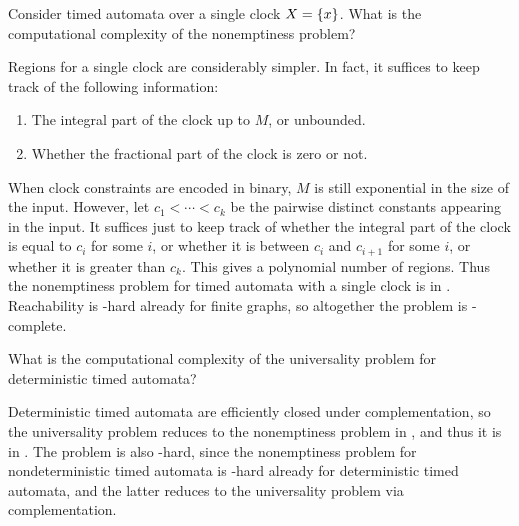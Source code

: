 \begin{exercise}
    Consider timed automata over a single clock $X = \left\{x\right\}$.
    What is the computational complexity of the nonemptiness problem?
\end{exercise}
\begin{solution}
    Regions for a single clock are considerably simpler.
    In fact, it suffices to keep track of the following information:
    \begin{enumerate}
        \item The integral part of the clock up to $M$, or unbounded.
        \item Whether the fractional part of the clock is zero or not.
    \end{enumerate}
    When clock constraints are encoded in binary, $M$ is still exponential in the size of the input.
    However, let $c_1 < \cdots < c_k$ be the pairwise distinct constants appearing in the input.
    It suffices just to keep track of whether the integral part of the clock is equal to $c_i$ for some $i$,
    or whether it is between $c_i$ and $c_{i + 1}$ for some $i$, or whether it is greater than $c_k$.
    This gives a polynomial number of regions.
    Thus the nonemptiness problem for timed automata with a single clock is in \NL.
    Reachability is \NL-hard already for finite graphs, so altogether the problem is \NL-complete.
\end{solution}

\begin{exercise}
    What is the computational complexity of the universality problem for deterministic timed automata?
\end{exercise}
\begin{solution}
    Deterministic timed automata are efficiently closed under complementation,
    so the universality problem reduces to the nonemptiness problem in \PTIME,
    and thus it is in \PSPACE.
    The problem is also \PSPACE-hard, since the nonemptiness problem for nondeterministic timed automata
    is \PSPACE-hard already for deterministic timed automata,
    and the latter reduces to the universality problem via complementation.
\end{solution}




